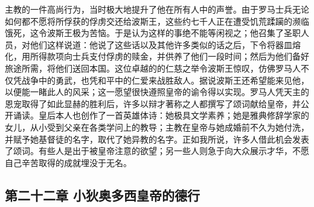 主教的一件高尚行为，当时极大地提升了他在所有人中的声誉。由于罗马士兵无论如何都不愿将所俘获的俘虏交还给波斯王，这些约七千人正在遭受饥荒蹂躏的濒临饿死，这令波斯王极为苦恼。于是认为这样的事绝不能等闲视之；他召集了圣职人员，对他们这样说道：他说了这些话以及其他许多类似的话之后，下令将器皿熔化，用所得款项向士兵支付俘虏的赎金，并供养了他们一段时间；然后为他们备好旅途所需，将他们送回本国。这位卓越的的仁慈之举令波斯王惊叹，仿佛罗马人不仅凭战争中的勇武，也凭和平中的仁爱来战胜敌人。据说波斯王还希望能来见他，以便能一睹此人的风采；这一愿望很快遵照皇帝的谕令得以实现。罗马人凭天主的恩宠取得了如此显赫的胜利后，许多以辩才著称之人都撰写了颂词献给皇帝，并公开诵读。皇后本人也创作了一首英雄体诗：她极具文学素养；她是雅典修辞学家的女儿，从小受到父亲在各类学问上的教导；主教在皇帝与她成婚前不久为她付洗，并赋予她基督徒的名字，取代了她异教的名字。正如我所说，许多人借此机会发表了颂词。有些人是出于被皇帝注意的欲望；另一些人则急于向大众展示才华，不愿自己辛苦取得的成就埋没于无名。\par


\subsection{第二十二章 小狄奥多西皇帝的德行}

